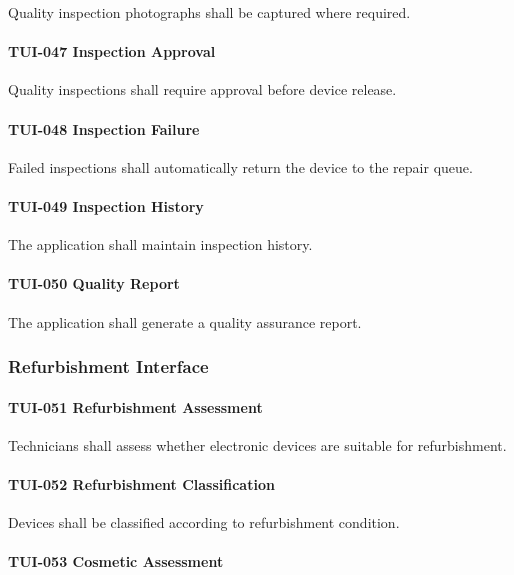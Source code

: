 Quality inspection photographs shall be captured where required.

\paragraph{TUI-047 Inspection Approval}

Quality inspections shall require approval before device release.

\paragraph{TUI-048 Inspection Failure}

Failed inspections shall automatically return the device to the repair
queue.

\paragraph{TUI-049 Inspection History}

The application shall maintain inspection history.

\paragraph{TUI-050 Quality Report}

The application shall generate a quality assurance report.


\subsubsection*{Refurbishment Interface}

\paragraph{TUI-051 Refurbishment Assessment}

Technicians shall assess whether electronic devices are suitable for
refurbishment.

\paragraph{TUI-052 Refurbishment Classification}

Devices shall be classified according to refurbishment condition.

\paragraph{TUI-053 Cosmetic Assessment}


